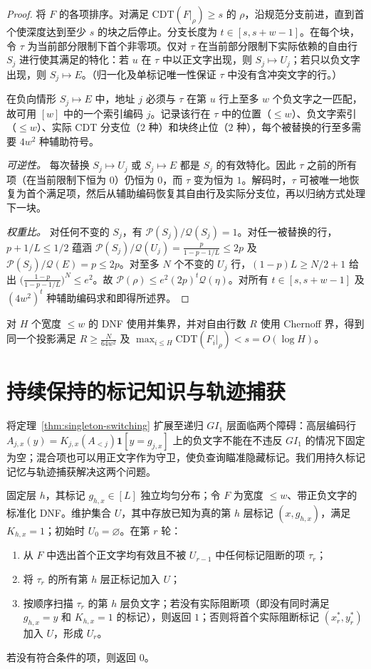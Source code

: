 \documentclass[11pt,a4paper]{article}
\theoremstyle{definition}
\theoremstyle{remark}
\newcommand{\CDT}{\mathrm{CDT}}
\newcommand{\GI}{GI_1}
\begin{document}
\begin{proof}
将 $F$ 的各项排序。对满足 $\CDT(F|_\rho)\ge s$ 的 $\rho$，沿规范分支前进，直到首个使深度达到至少 $s$ 的块之后停止。分支长度为 $t\in[s,s+w-1]$。在每个块，令 $\tau$ 为当前部分限制下首个非零项。仅对 $\tau$ 在当前部分限制下实际依赖的自由行 $S_j$ 进行使其满足的特化：若 $u$ 在 $\tau$ 中以正文字出现，则 $S_j\mapsto U_j$；若只以负文字出现，则 $S_j\mapsto E$。（归一化及单标记唯一性保证 $\tau$ 中没有含冲突文字的行。）

在负向情形 $S_j\mapsto E$ 中，地址 $j$ 必须与 $\tau$ 在第 $u$ 行上至多 $w$ 个负文字之一匹配，故可用 $[w]$ 中的一个索引编码 $j$。记录该行在 $\tau$ 中的位置（$\le w$）、负文字索引（$\le w$）、实际 CDT 分支位（$2$ 种）和块终止位（$2$ 种），每个被替换的行至多需要 $4w^2$ 种辅助符号。

\emph{可逆性。} 每次替换 $S_j\mapsto U_j$ 或 $S_j\mapsto E$ 都是 $S_j$ 的有效特化。因此 $\tau$ 之前的所有项（在当前限制下恒为 $0$）仍恒为 $0$，而 $\tau$ 变为恒为 $1$。解码时，$\tau$ 可被唯一地恢复为首个满足项，然后从辅助编码恢复其自由行及实际分支位，再以归纳方式处理下一块。

\emph{权重比。} 对任何不变的 $S_j$，有 $\mathcal P(S_j)/\mathcal Q(S_j)=1$。对任一被替换的行，$p+1/L\le1/2$ 蕴涵 $\mathcal P(S_j)/\mathcal Q(U_j)=\frac{p}{1-p-1/L}\le2p$ 及 $\mathcal P(S_j)/\mathcal Q(E)=p\le2p$。对至多 $N$ 个不变的 $U_j$ 行，$(1-p)L\ge N/2+1$ 给出 $\bigl(\frac{1-p}{1-p-1/L}\bigr)^N\le e^2$。故 $\mathcal P(\rho)\le e^2(2p)^t\mathcal Q(\eta)$。对所有 $t\in[s,s+w-1]$ 及 $(4w^2)^t$ 种辅助编码求和即得所述界。
\end{proof}
对 $H$ 个宽度 $\le w$ 的 DNF 使用并集界，并对自由行数 $R$ 使用 Chernoff 界，得到同一个投影满足 $R\ge\frac{N}{64w^2}$ 及 $\max_{i\le H}\CDT(F_i|_\rho)<s=O(\log H)$。

\section{持续保持的标记知识与轨迹捕获}

将定理~\ref{thm:singleton-switching} 扩展至递归 $\GI$ 层面临两个障碍：高层编码行 $A_{j,x}(y)=K_{j,x}(A_{<j})\mathbf1[y=g_{j,x}]$ 上的负文字不能在不违反 $\GI$ 的情况下固定为空；混合项也可以用正文字作为守卫，使负查询瞄准隐藏标记。我们用持久标记记忆与轨迹捕获解决这两个问题。

固定层 $h$，其标记 $g_{h,x}\in[L]$ 独立均匀分布；令 $F$ 为宽度 $\le w$、带正负文字的标准化 DNF。维护集合 $U$，其中存放已知为真的第 $h$ 层标记 $(x,g_{h,x})$，满足 $K_{h,x}=1$；初始时 $U_0=\varnothing$。在第 $r$ 轮：
\begin{enumerate}
  \item 从 $F$ 中选出首个正文字均有效且不被 $U_{r-1}$ 中任何标记阻断的项 $\tau_r$；
  \item 将 $\tau_r$ 的所有第 $h$ 层正标记加入 $U$；
  \item 按顺序扫描 $\tau_r$ 的第 $h$ 层负文字；若没有实际阻断项（即没有同时满足 $g_{h,x}=y$ 和 $K_{h,x}=1$ 的标记），则返回 $1$；否则将首个实际阻断标记 $(x_r^*,y_r^*)$ 加入 $U$，形成 $U_r$。
\end{enumerate}
若没有符合条件的项，则返回 $0$。
\end{document}
